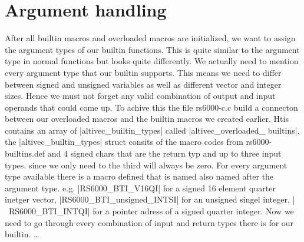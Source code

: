\chapter{Argument handling}
\label{chapter:argument handling}

After all builtin macros and overloaded macros are initialized, we want to assign the argument types of our builtin functions. This is quite similar to the argument type in normal functions but looks quite differently. We actually need to mention every argument type that our builtin supports. This means we need to differ between signed and unsigned variables as well as different vector and integer sizes.
Hence we must not forget any valid combination of output and input operands that could come up.
To achive this the file rs6000-c.c build a connecton between our overloaded macros and the builtin macros we created earlier. Htis contains an array of |altivec_builtin_types| called |altivec_overloaded_ builtins|. the |altivec_builtin_types| struct consits of the macro codes from rs6000-builtins.def and 4 signed chars that are the return typ and up to three input types. since we only need to the third will always be zero. 
For every argument type available there is a macro defined that is named also named after the argument type. e.g. |RS6000_BTI_V16QI| for a signed 16 element quarter inetger vector, |RS6000_BTI_unsigned_INTSI| for an unsigned singel integer, |~RS6000_BTI_INTQI| for a pointer adress of a signed quarter integer.
Now we need to go through every combination of input and return types there is for our builtin.
…